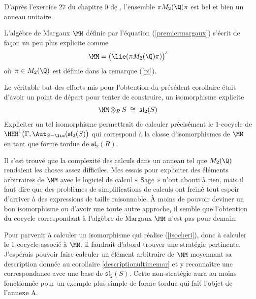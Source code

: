 \begin{Rem} D'après l'exercice 27 du chapitre 0 de \cite{FDnoncom}, l'ensemble $\pi M_2(\Q) \pi$ est bel et bien un anneau unitaire. 
\end{Rem}

\begin{Cor} \label{descriptionultimemar} L'algèbre de Margaux $\MM$ définie par l'équation (\ref{premiermargaux}) s'écrit de façon un peu plus explicite comme
$$ \MM = \big(\lie(\pi M_2(\Q) \pi)\big)' $$
où $\,\pi \in M_2(\Q)$ est définie dans la remarque (\ref{pi}).
\end{Cor}


\begin{Rem} Le véritable but des efforts mis pour l'obtention du précédent corollaire était d'avoir un point de départ pour tenter de construire, un isomorphisme explicite 
\begin{equation} \label{isocheri}
\MM \otimes_R S \; \cong \; \mathfrak{sl}_2(S)
\end{equation}
Expliciter un tel isomorphisme permettrait de calculer précisément le 1-cocycle de \linebreak $\HHH^1\big(\Gamma,\Aut_{S-\lie}(\mathfrak{sl}_2(S)\big)$ qui correspond à la classe d'isomorphismes de $\MM$ en tant que forme tordue de $\mathfrak{sl}_2(R)$.

Il s'est trouvé que la complexité des calculs dans un anneau tel que $M_2(\Q)$ rendaient les choses assez difficiles. Mes essais pour expliciter des éléments arbitraires de $\MM$ avec le logiciel de calcul « Sage » n'ont abouti à rien, mais il faut dire que des problèmes de simplifications de calculs ont freiné tout espoir d'arriver à des expressions de taille raisonnable. À moins de pouvoir deviner un bon isomorphisme ou d'avoir une toute autre approche, il semble que l'obtention du cocycle correspondant à l'algèbre de Margaux $\MM$ n'est pas pour demain.
\end{Rem}

Pour parvenir à calculer un isomorphisme qui réalise (\ref{isocheri}), donc à calculer le 1-cocycle associé à $\MM$, il faudrait d'abord trouver une stratégie pertinente. J'espérais pouvoir faire calculer un élément arbitraire de $\MM$ moyennant sa description donnée au corollaire \ref{descriptionultimemar} et y reconnaître une correspondance avec une base de $\mathfrak{sl}_2(S)$. Cette non-stratégie aura au moins fonctionnée pour un exemple plus simple de forme tordue qui fait l'objet de l'annexe A.



